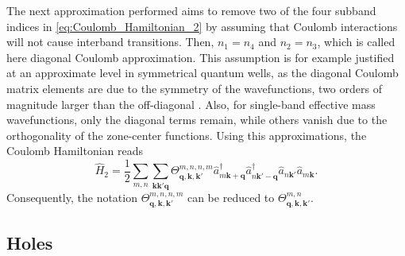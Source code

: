 The next approximation performed aims to remove two of the four subband
indices in \ref{eq:Coulomb_Hamiltonian_2} by assuming that Coulomb
interactions will not cause interband transitions. Then, $n_{1}=n_{4}$
and $n_{2}=n_{3}$, which is called here diagonal Coulomb approximation.
This assumption is for example justified at an approximate level in
symmetrical quantum wells, as the diagonal Coulomb matrix elements
are due to the symmetry of the wavefunctions, two orders of magnitude
larger than the off-diagonal \citet{Hader2003}. Also, for single-band
effective mass wavefunctions, only the diagonal terms remain, while
others vanish due to the orthogonality of the zone-center functions.
Using this approximations, the Coulomb Hamiltonian reads\begin{equation}
\hat{H}_{2}=\frac{1}{2}\sum_{m,n}\sum_{\mathbf{k}\mathbf{k}'\mathbf{q}}\Theta_{\mathbf{q},\mathbf{k},\mathbf{k}'}^{m,n,n,m}\hat{a}_{m\mathbf{k}+\mathbf{q}}^{\dagger}\hat{a}_{n\mathbf{k}'-\mathbf{q}}^{\dagger}\hat{a}_{n\mathbf{k}'}\hat{a}_{m\mathbf{k}}.\label{eq:Coulomb_Hamiltonian_3}\end{equation}
Consequently, the notation $\Theta_{\mathbf{q},\mathbf{k},\mathbf{k}'}^{m,n,n,m}$
can be reduced to $\Theta_{\mathbf{q},\mathbf{k},\mathbf{k}'}^{m,n}$.


\subsection{Holes}

